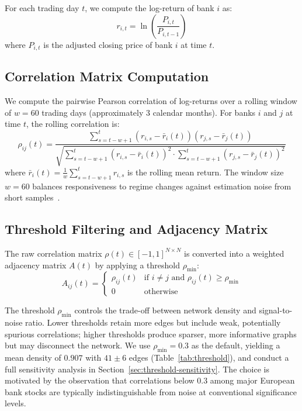 For each trading day $t$, we compute the log-return of bank $i$ as:
\begin{equation}
    r_{i,t} = \ln\!\left(\frac{P_{i,t}}{P_{i,t-1}}\right)
    \label{eq:logreturn}
\end{equation}
where $P_{i,t}$ is the adjusted closing price of bank $i$ at time $t$.

\subsection{Correlation Matrix Computation}

We compute the pairwise Pearson correlation of log-returns over a rolling window of $w = 60$ trading days (approximately 3 calendar months). For banks $i$ and $j$ at time $t$, the rolling correlation is:
\begin{equation}
    \rho_{ij}(t) = \frac{\sum_{s=t-w+1}^{t} \left(r_{i,s} - \bar{r}_i(t)\right)\left(r_{j,s} - \bar{r}_j(t)\right)}{\sqrt{\sum_{s=t-w+1}^{t}\left(r_{i,s} - \bar{r}_i(t)\right)^2 \cdot \sum_{s=t-w+1}^{t}\left(r_{j,s} - \bar{r}_j(t)\right)^2}}
    \label{eq:pearson}
\end{equation}
where $\bar{r}_i(t) = \frac{1}{w}\sum_{s=t-w+1}^{t} r_{i,s}$ is the rolling mean return. The window size $w=60$ balances responsiveness to regime changes against estimation noise from short samples~\cite{laloux1999noise,mantegna1999introduction}.

\subsection{Threshold Filtering and Adjacency Matrix}

The raw correlation matrix $\rho(t) \in [-1, 1]^{N \times N}$ is converted into a weighted adjacency matrix $A(t)$ by applying a threshold $\rho_{\min}$:
\begin{equation}
    A_{ij}(t) = \begin{cases}
        \rho_{ij}(t) & \text{if } i \neq j \text{ and } \rho_{ij}(t) \geq \rho_{\min} \\
        0 & \text{otherwise}
    \end{cases}
    \label{eq:threshold}
\end{equation}

The threshold $\rho_{\min}$ controls the trade-off between network density and signal-to-noise ratio. Lower thresholds retain more edges but include weak, potentially spurious correlations; higher thresholds produce sparser, more informative graphs but may disconnect the network. We use $\rho_{\min} = 0.3$ as the default, yielding a mean density of $0.907$ with $41 \pm 6$ edges (Table~\ref{tab:threshold}), and conduct a full sensitivity analysis in Section~\ref{sec:threshold-sensitivity}. The choice is motivated by the observation that correlations below $0.3$ among major European bank stocks are typically indistinguishable from noise at conventional significance levels.

